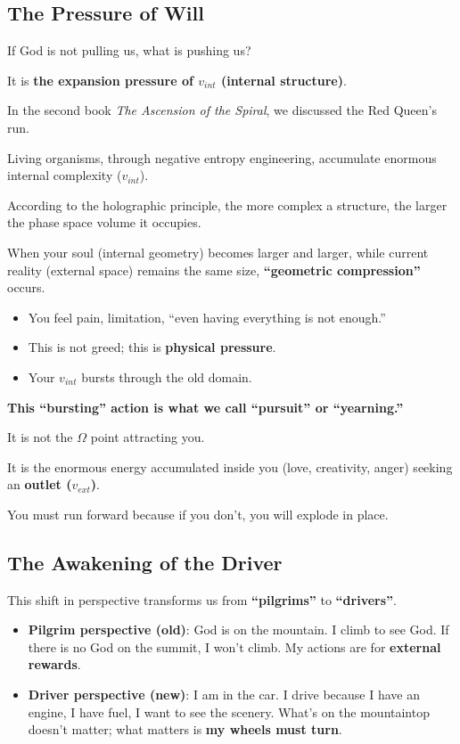 \subsection{The Pressure of Will}

If God is not pulling us, what is pushing us?

It is \textbf{the expansion pressure of $v_{int}$ (internal structure)}.

In the second book \textit{The Ascension of the Spiral}, we discussed the Red Queen's run.

Living organisms, through negative entropy engineering, accumulate enormous internal complexity ($v_{int}$).

According to the holographic principle, the more complex a structure, the larger the phase space volume it occupies.

When your soul (internal geometry) becomes larger and larger, while current reality (external space) remains the same size, \textbf{``geometric compression''} occurs.

\begin{itemize}
\item You feel pain, limitation, ``even having everything is not enough.''

\item This is not greed; this is \textbf{physical pressure}.

\item Your $v_{int}$ bursts through the old domain.
\end{itemize}

\textbf{This ``bursting'' action is what we call ``pursuit'' or ``yearning.''}

It is not the $\Omega$ point attracting you.

It is the enormous energy accumulated inside you (love, creativity, anger) seeking an \textbf{outlet ($v_{ext}$)}.

You must run forward because if you don't, you will explode in place.

\subsection{The Awakening of the Driver}

This shift in perspective transforms us from \textbf{``pilgrims''} to \textbf{``drivers''}.

\begin{itemize}
\item \textbf{Pilgrim perspective (old)}: God is on the mountain. I climb to see God. If there is no God on the summit, I won't climb. My actions are for \textbf{external rewards}.

\item \textbf{Driver perspective (new)}: I am in the car. I drive because I have an engine, I have fuel, I want to see the scenery. What's on the mountaintop doesn't matter; what matters is \textbf{my wheels must turn}.
\end{itemize}

